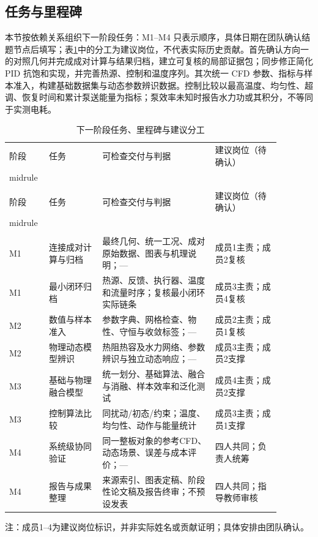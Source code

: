 \documentclass[UTF8]{midterm}
\begin{document}
\subsection{任务与里程碑}
本节按依赖关系组织下一阶段任务：M1--M4 只表示顺序，具体日期在团队确认结题节点后填写；表\ref{tab:16}中的分工为建议岗位，不代表实际历史贡献。首先确认方向一的对照几何并完成成对计算与结果归档，建立可复核的局部证据包；同步修正简化 PID 抗饱和实现，并完善热源、控制和温度序列。其次统一 CFD 参数、指标与样本准入，构建基础数据集与动态参数辨识数据。控制比较以最高温度、均匀性、超调、恢复时间和累计泵送能量为指标；泵效率未知时报告水力功或其积分，不等同于实测电耗。
\begingroup\small
\setlength{\tabcolsep}{4pt}
\begin{longtable}{>{\centering\arraybackslash}p{0.10\linewidth}>{\centering\arraybackslash}p{0.18\linewidth}>{\centering\arraybackslash}p{0.38\linewidth}>{\centering\arraybackslash}p{0.22\linewidth}}
\caption{下一阶段任务、里程碑与建议分工}\label{tab:16}\\
\toprule
\rowcolor{ydzjlight} 阶段 & 任务 & 可检查交付与判据 & 建议岗位（待确认） \\midrule\\\midrule
\endfirsthead
\multicolumn{4}{l}{表\thetable\ 续：下一阶段研究计划}\\
\toprule
\rowcolor{ydzjlight} 阶段 & 任务 & 可检查交付与判据 & 建议岗位（待确认） \\midrule\\\midrule
\endhead
\midrule\multicolumn{4}{r}{续下页}\\\endfoot
\bottomrule\endlastfoot
M1 & 连接成对计算与归档 & 最终几何、统一工况、成对原始数据、图表与机理说明；— & 成员1主责；成员2复核 \\
M1 & 最小闭环归档 & 热源、反馈、执行器、温度和流量时序；复核最小闭环实际链条 & 成员3主责；成员4复核 \\
M2 & 数值与样本准入 & 参数字典、网格检查、物性、守恒与收敛标签；— & 成员2主责；成员1复核 \\
M2 & 物理动态模型辨识 & 热阻热容及水力网络、参数辨识与独立动态响应；— & 成员3主责；成员2支撑 \\
M3 & 基础与物理融合模型 & 统一划分、基础算法、融合与消融、样本效率和泛化测试 & 成员4主责；成员2支撑 \\
M3 & 控制算法比较 & 同扰动/初态/约束；温度、均匀性、动作与能量统计 & 成员3主责；成员1支撑 \\
M4 & 系统级协同验证 & 同一整板对象的参考CFD、动态场景、误差与成本评价；— & 四人共同；负责人统筹 \\
M4 & 报告与成果整理 & 来源索引、图表定稿、阶段性论文稿及报告终审；不预设发表 & 四人共同；指导教师审核 \\
\end{longtable}
\endgroup
\noindent\footnotesize 注：成员1--4为建议岗位标识，并非实际姓名或贡献证明；具体安排由团队确认。\normalsize
\end{document}
